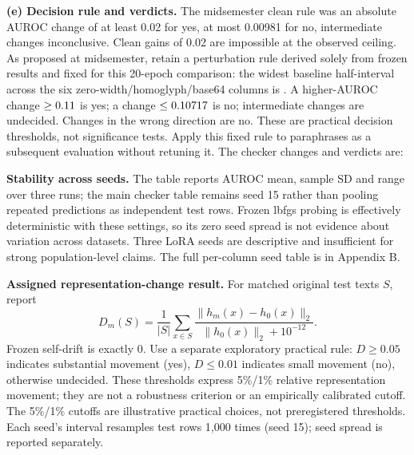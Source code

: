 \documentclass[10pt]{article}
\begin{document}
\textbf{(e) Decision rule and verdicts.} The midsemester clean rule was an absolute AUROC change of at least 0.02 for yes, at most 0.00981 for no, intermediate changes inconclusive. Clean gains of 0.02 are impossible at the observed ceiling. As proposed at midsemester, retain a perturbation rule derived solely from frozen results and fixed for this 20-epoch comparison: the widest baseline half-interval across the six zero-width/homoglyph/base64 columns is \NoMargin. A higher-AUROC change $\geq0.11$ is yes; a change $\leq0.10717$ is no; intermediate changes are undecided. Changes in the wrong direction are no. These are practical decision thresholds, not significance tests. Apply this fixed rule to paraphrases as a subsequent evaluation without retuning it. The checker changes and verdicts are:
\begin{center}\small\end{center}

\textbf{Stability across seeds.} The table reports AUROC mean, sample SD and range over three runs; the main checker table remains seed 15 rather than pooling repeated predictions as independent test rows. Frozen lbfgs probing is effectively deterministic with these settings, so its zero seed spread is not evidence about variation across datasets. Three LoRA seeds are descriptive and insufficient for strong population-level claims.
The full per-column seed table is in Appendix B.

\newpage
\textbf{Assigned representation-change result.} For matched original test texts $S$, report
\[
 D_m(S)=\frac1{|S|}\sum_{x\in S}\frac{\|h_m(x)-h_0(x)\|_2}{\|h_0(x)\|_2+10^{-12}}.
\]
Frozen self-drift is exactly 0. Use a separate exploratory practical rule: $D\geq0.05$ indicates substantial movement (yes), $D\leq0.01$ indicates small movement (no), otherwise undecided. These thresholds express 5\%/1\% relative representation movement; they are not a robustness criterion or an empirically calibrated cutoff. The 5\%/1\% cutoffs are illustrative practical choices, not preregistered thresholds. Each seed's interval resamples test rows 1,000 times (seed 15); seed spread is reported separately.
\begin{center}\small\end{center}
\DriftDescription
\end{document}

